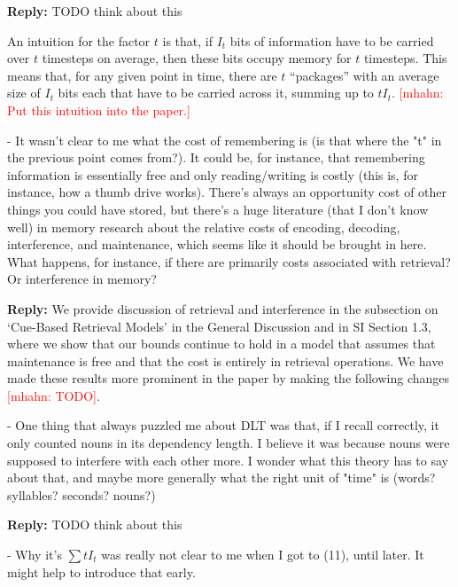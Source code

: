 \documentclass{article}[11pt,a4paper,oneside]
\newcommand\mhahn[1]{\textcolor{red}{[mhahn: #1]}}
\newenvironment{reply}
  {\par\medskip
   \color{blue}%
   \begin{framed}
   \textbf{Reply: }\ignorespaces}
 {\end{framed}
  \medskip}
\begin{document}
\begin{reply}
	TODO think about this

An intuition for the factor $t$ is that, if $I_t$ bits of information have to be carried over $t$ timesteps on average, then these bits occupy memory for $t$ timesteps.
This means that, for any given point in time, there are $t$ ``packages'' with an average size of $I_t$ bits each that have to be carried across it, summing up to $t I_t$.
	\mhahn{Put this intuition into the paper.}

\end{reply}

- It wasn't clear to me what the cost of remembering is (is that where the "t" in the previous point comes from?). It could be, for instance, that remembering information is essentially free and only reading/writing is costly (this is, for instance, how a thumb drive works). There's always an opportunity cost of other things you could have stored, but there's a huge literature (that I don't know well) in memory research about the relative costs of encoding, decoding, interference, and maintenance, which seems like it should be brought in here. What happens, for instance, if there are primarily costs associated with retrieval? Or interference in memory?

\begin{reply}
We provide discussion of retrieval and interference in the subsection on `Cue-Based Retrieval Models' in the General Discussion and in SI Section 1.3, where we show that our bounds continue to hold in a model that assumes that maintenance is free and that the cost is entirely in retrieval operations.
	We have made these results more prominent in the paper by making the following changes \mhahn{TODO}.
\end{reply}

- One thing that always puzzled me about DLT was that, if I recall correctly, it only counted nouns in its dependency length. I believe it was because nouns were supposed to interfere with each other more. I wonder what this theory has to say about that, and maybe more generally what the right unit of "time" is (words? syllables? seconds? nouns?)

\begin{reply}
	TODO think about this
\end{reply}

- Why it's $\sum t I_t$ was really not clear to me when I got to (11), until later. It might help to introduce that early.
\end{document}

